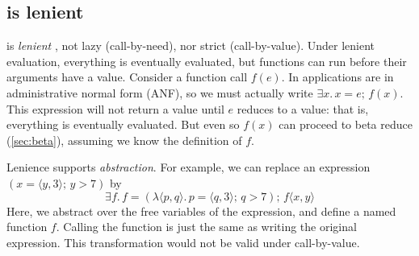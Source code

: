 \documentclass[acmsmall,review,anonymous,dvipsnames]{acmart}
\newcommand{\Varid}[1]{\mathit{#1}}
\begin{document}

\subsection{\versecalc{} is lenient} \label{sec:lenient}

\versecalc{} is \emph{lenient} \cite{lenience},
not lazy (call-by-need), nor strict (call-by-value).
Under lenient
evaluation, everything is eventually evaluated, but functions can run
before their arguments have a value.
Consider a function
call \ensuremath{\Varid{f}(\Varid{e})}.  In \versecalc{} applications are in administrative normal form (ANF),
so we must actually write \ensuremath{\exists\Varid{x}.\,\Varid{x}\mathrel{=}\Varid{e};\,\Varid{f}(\Varid{x})}. This expression will not return a value until
\ensuremath{\Varid{e}} reduces to a value: that is, everything is eventually evaluated.  But even so \ensuremath{\Varid{f}(\Varid{x})} can proceed
to beta reduce (\cref{sec:beta}), assuming we know the definition of \ensuremath{\Varid{f}}.

Lenience supports \emph{abstraction}.  For example, we can replace an expression \ensuremath{(\Varid{x}\mathrel{=}\langle{}\Varid{y},\mathrm{3}\rangle;\,\Varid{y}\mathbin{>}\mathrm{7})} by
$$
\ensuremath{\exists\Varid{f}.\,\Varid{f}\mathrel{=}(\lambda\langle{}\Varid{p},\Varid{q}\rangle.\,\Varid{p}\mathrel{=}\langle{}\Varid{q},\mathrm{3}\rangle;\,\Varid{q}\mathbin{>}\mathrm{7});\,\Varid{f}\langle\Varid{x},\Varid{y}\rangle}
$$
Here, we abstract over the free variables of the expression, and define a named function \ensuremath{\Varid{f}}.
Calling the function is just the same as writing the original expression.
This transformation would not be valid under call-by-value.
\end{document}
